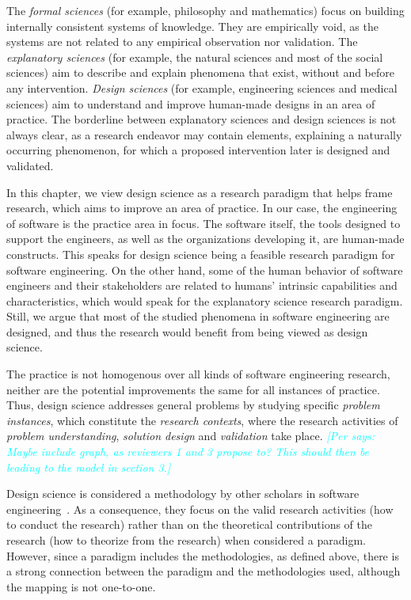 \documentclass[graybox]{svmult}
\newcommand{\per}[1]{\textcolor{cyan}{{\it [Per says: #1]}}}
\newcommand{\per}[1]{}
\begin{document}
The \emph{formal sciences} (for example, philosophy and mathematics) focus on building internally consistent systems of knowledge. They are empirically void, as the systems are not related to any empirical observation nor validation. The \emph{explanatory sciences} (for example, the natural sciences and most of the social sciences) aim to describe and explain phenomena that exist, without and before any intervention. \emph{Design sciences} (for example, engineering sciences and medical sciences) aim to understand and improve human-made designs in an area of practice. The borderline between explanatory sciences and design sciences is not always clear, as a research endeavor may contain elements, explaining a naturally occurring phenomenon, for which a proposed intervention later is designed and validated. 

In this chapter, we view design science as a research paradigm that helps frame research, which aims to improve an area of practice. In our case, the engineering of software is the practice area in focus. The software itself, the tools designed to support the engineers, as well as the organizations developing it, are human-made constructs. This speaks for design science being a feasible research paradigm for software engineering. On the other hand, some of the human behavior of software engineers and their stakeholders are related to humans' intrinsic capabilities and characteristics, which would speak for the explanatory science research paradigm. Still, we argue that most of the studied phenomena in software engineering are designed, and thus the research would benefit from being viewed as design science.

The practice is not homogenous over all kinds of software engineering research, neither are the potential improvements the same for all instances of practice. Thus, design science addresses general problems by studying  specific \emph{problem instances}, which constitute the \emph{research contexts}, where the research activities of \emph{problem understanding}, \emph{solution design} and \emph{validation} take place. \per{Maybe include graph, as reviewers 1 and 3 propose to? This should then be leading to the model in section 3.}

Design science is considered a methodology by other scholars in software engineering~\cite{Wohlin2015}. As a consequence, they focus on the valid research activities (how to conduct the research) rather than on the theoretical contributions of the research (how to theorize from the research) when considered a paradigm. However, since a paradigm includes the methodologies, as defined above, there is a strong connection between the paradigm and the methodologies used, although the mapping is not one-to-one.
\end{document}
